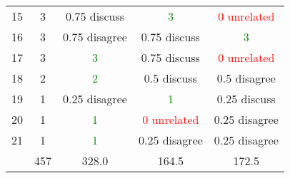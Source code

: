 \begin{center}
\begin{tabular}{ r | c || c c c }
  15                   & 3      & 0.75 discuss                 & \textcolor{green}{3}         & \textcolor{red}{0 unrelated} \\
  16                   & 3      & 0.75 disagree                & 0.75 discuss                 & \textcolor{green}{3}         \\
  17                   & 3      & \textcolor{green}{3}         & 0.75 discuss                 & \textcolor{red}{0 unrelated} \\
  18                   & 2      & \textcolor{green}{2}         & 0.5 discuss                  & 0.5 disagree                 \\
  19                   & 1      & 0.25 disagree                & \textcolor{green}{1}         & 0.25 discuss                 \\
  20                   & 1      & \textcolor{green}{1}         & \textcolor{red}{0 unrelated} & 0.25 disagree                \\
  21                   & 1      & \textcolor{green}{1}         & 0.25 disagree                & 0.25 disagree                \\ \hline
                       & 457    & 328.0                        & 164.5                        & 172.5                        \\
 \end{tabular}
\end{center}
